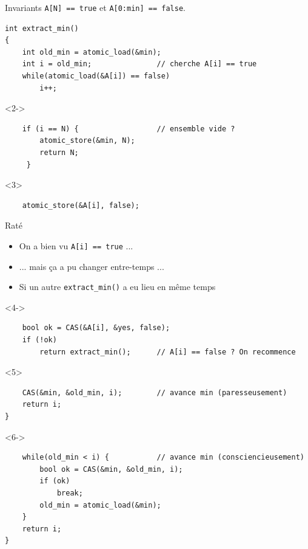 \documentclass[xcolor={x11names,svgnames},x11names,svgnames]{beamer}
\begin{document}


\begin{frame}[fragile,label=lf_intset]

  \smallskip
  
\begin{alertblock}{Invariants}
  \texttt{A[N] == true} et \texttt{A[0:min] == false}.
\end{alertblock}

\begin{overlayarea}{\textwidth}{8cm}
\begin{verbatim}
int extract_min()
{
    int old_min = atomic_load(&min);
    int i = old_min;               // cherche A[i] == true
    while(atomic_load(&A[i]) == false)
        i++;
\end{verbatim}
\begin{onlyenv}<2->%
\begin{verbatim}
    if (i == N) {                  // ensemble vide ?
        atomic_store(&min, N);     
        return N;
     }
\end{verbatim}
\end{onlyenv}%
\begin{onlyenv}<3>
\begin{verbatim}
    atomic_store(&A[i], false);
  \end{verbatim}
  \begin{block}{Raté}
    \begin{itemize}
    \item On a bien vu \texttt{A[i] == true} ...
    \item ... mais ça a pu changer entre-temps ...
    \item Si un autre \texttt{extract\_min()} a eu lieu en même temps
    \end{itemize}
  \end{block}
\end{onlyenv}
\begin{onlyenv}<4->
\begin{verbatim}
    bool ok = CAS(&A[i], &yes, false);
    if (!ok)         
        return extract_min();      // A[i] == false ? On recommence   
\end{verbatim}
\end{onlyenv}
\begin{onlyenv}<5>
\begin{verbatim}
    CAS(&min, &old_min, i);        // avance min (paresseusement)
    return i;
}
\end{verbatim}
\end{onlyenv}
\begin{onlyenv}<6->
\begin{verbatim}
    while(old_min < i) {           // avance min (consciencieusement)
        bool ok = CAS(&min, &old_min, i);
        if (ok)
            break;
        old_min = atomic_load(&min);
    }
    return i;
}
\end{verbatim}
\end{onlyenv}
\end{overlayarea}

\end{frame}
\end{document}
